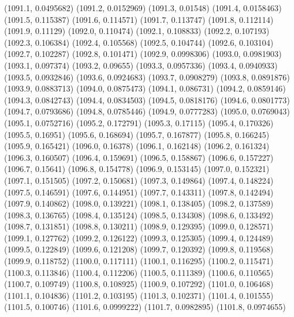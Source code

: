 {					(1091.1, 0.0495682)
					(1091.2, 0.0152969)
					(1091.3, 0.01548)
					(1091.4, 0.0158463)
					(1091.5, 0.115387)
					(1091.6, 0.114571)
					(1091.7, 0.113747)
					(1091.8, 0.112114)
					(1091.9, 0.11129)
					(1092.0, 0.110474)
					(1092.1, 0.108833)
					(1092.2, 0.107193)
					(1092.3, 0.106384)
					(1092.4, 0.105568)
					(1092.5, 0.104744)
					(1092.6, 0.103104)
					(1092.7, 0.102287)
					(1092.8, 0.101471)
					(1092.9, 0.0998306)
					(1093.0, 0.0981903)
					(1093.1, 0.097374)
					(1093.2, 0.09655)
					(1093.3, 0.0957336)
					(1093.4, 0.0940933)
					(1093.5, 0.0932846)
					(1093.6, 0.0924683)
					(1093.7, 0.0908279)
					(1093.8, 0.0891876)
					(1093.9, 0.0883713)
					(1094.0, 0.0875473)
					(1094.1, 0.086731)
					(1094.2, 0.0859146)
					(1094.3, 0.0842743)
					(1094.4, 0.0834503)
					(1094.5, 0.0818176)
					(1094.6, 0.0801773)
					(1094.7, 0.0793686)
					(1094.8, 0.0785446)
					(1094.9, 0.0777283)
					(1095.0, 0.0769043)
					(1095.1, 0.0752716)
					(1095.2, 0.172791)
					(1095.3, 0.17115)
					(1095.4, 0.170326)
					(1095.5, 0.16951)
					(1095.6, 0.168694)
					(1095.7, 0.167877)
					(1095.8, 0.166245)
					(1095.9, 0.165421)
					(1096.0, 0.16378)
					(1096.1, 0.162148)
					(1096.2, 0.161324)
					(1096.3, 0.160507)
					(1096.4, 0.159691)
					(1096.5, 0.158867)
					(1096.6, 0.157227)
					(1096.7, 0.15641)
					(1096.8, 0.154778)
					(1096.9, 0.153145)
					(1097.0, 0.152321)
					(1097.1, 0.151505)
					(1097.2, 0.150681)
					(1097.3, 0.149864)
					(1097.4, 0.148224)
					(1097.5, 0.146591)
					(1097.6, 0.144951)
					(1097.7, 0.143311)
					(1097.8, 0.142494)
					(1097.9, 0.140862)
					(1098.0, 0.139221)
					(1098.1, 0.138405)
					(1098.2, 0.137589)
					(1098.3, 0.136765)
					(1098.4, 0.135124)
					(1098.5, 0.134308)
					(1098.6, 0.133492)
					(1098.7, 0.131851)
					(1098.8, 0.130211)
					(1098.9, 0.129395)
					(1099.0, 0.128571)
					(1099.1, 0.127762)
					(1099.2, 0.126122)
					(1099.3, 0.125305)
					(1099.4, 0.124489)
					(1099.5, 0.122849)
					(1099.6, 0.121208)
					(1099.7, 0.120392)
					(1099.8, 0.119568)
					(1099.9, 0.118752)
					(1100.0, 0.117111)
					(1100.1, 0.116295)
					(1100.2, 0.115471)
					(1100.3, 0.113846)
					(1100.4, 0.112206)
					(1100.5, 0.111389)
					(1100.6, 0.110565)
					(1100.7, 0.109749)
					(1100.8, 0.108925)
					(1100.9, 0.107292)
					(1101.0, 0.106468)
					(1101.1, 0.104836)
					(1101.2, 0.103195)
					(1101.3, 0.102371)
					(1101.4, 0.101555)
					(1101.5, 0.100746)
					(1101.6, 0.0999222)
					(1101.7, 0.0982895)
					(1101.8, 0.0974655)
}

